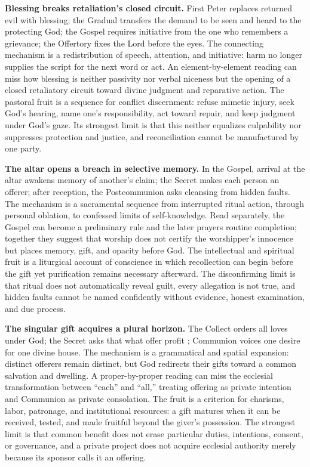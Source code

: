 \begin{deepstudy}
\noindent\textbf{Blessing breaks retaliation's closed circuit.\enspace{}}
First Peter replaces returned evil with blessing; the Gradual transfers the demand to be seen and heard to the protecting God; the Gospel requires initiative from the one who remembers a grievance; the Offertory fixes the Lord before the eyes. The connecting mechanism is a redistribution of speech, attention, and initiative: harm no longer supplies the script for the next word or act. An element-by-element reading can miss how blessing is neither passivity nor verbal niceness but the opening of a closed retaliatory circuit toward divine judgment and reparative action. The pastoral fruit is a sequence for conflict discernment: refuse mimetic injury, seek God's hearing, name one's responsibility, act toward repair, and keep judgment under God's gaze. Its strongest limit is that this neither equalizes culpability nor suppresses protection and justice, and reconciliation cannot be manufactured by one party.

\noindent\textbf{The altar opens a breach in selective memory.\enspace{}}
\enlargethispage{\baselineskip}
In the Gospel, arrival at the altar awakens memory of another's claim; the Secret makes each person an offerer; after reception, the Postcommunion asks cleansing from hidden faults. The mechanism is a sacramental sequence from interrupted ritual action, through personal oblation, to confessed limits of self-knowledge. Read separately, the Gospel can become a preliminary rule and the later prayers routine completion; together they suggest that worship does not certify the worshipper's innocence but places memory, gift, and opacity before God. The intellectual and spiritual fruit is a liturgical account of conscience in which recollection can begin before the gift yet purification remains necessary afterward. The disconfirming limit is that ritual does not automatically reveal guilt, every allegation is not true, and hidden faults cannot be named confidently without evidence, honest examination, and due process.

\noindent\textbf{The singular gift acquires a plural horizon.\enspace{}}
The Collect orders all loves under God; the Secret asks that what  offer profit ; Communion voices one desire for one divine house. The mechanism is a grammatical and spatial expansion: distinct offerers remain distinct, but God redirects their gifts toward a common salvation and dwelling. A proper-by-proper reading can miss the ecclesial transformation between ``each'' and ``all,'' treating offering as private intention and Communion as private consolation. The fruit is a criterion for charisms, labor, patronage, and institutional resources: a gift matures when it can be received, tested, and made fruitful beyond the giver's possession. The strongest limit is that common benefit does not erase particular duties, intentions, consent, or governance, and a private project does not acquire ecclesial authority merely because its sponsor calls it an offering.


\end{deepstudy}

